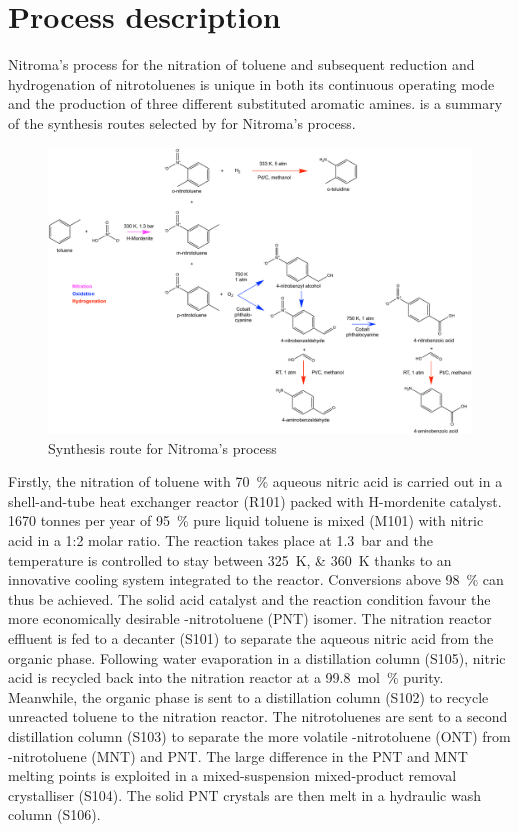 \section{Process description}

Nitroma's process for the nitration of toluene and subsequent reduction and hydrogenation of nitrotoluenes is unique in both its continuous operating mode and the production of three different substituted aromatic amines.   is a summary of the synthesis routes selected by for Nitroma's process.
\begin{figure}[H]
    \centering
    \includegraphics[width=0.8\linewidth]{chapters/2-reaction/figures/routes-chosen.pdf}
    \caption{Synthesis route for Nitroma's process}
    \label{fig:routes-SI}
\end{figure}

Firstly, the nitration of toluene with \SI{70}{\percent} aqueous nitric acid is carried out in a shell-and-tube heat exchanger reactor (R101) packed with H-mordenite catalyst. 1670 tonnes per year of \SI{95}{\percent} pure liquid toluene is mixed (M101) with nitric acid in a 1:2 molar ratio. The reaction takes place at \SI{1.3}{\bar} and the temperature is controlled to stay between \SIlist{325;360}{\K} thanks to an innovative cooling system integrated to the reactor. Conversions above \SI{98}{\percent} can thus be achieved. The solid acid catalyst and the reaction condition favour the more economically desirable \para-nitrotoluene (PNT) isomer. The nitration reactor effluent is fed to a decanter (S101) to separate the aqueous nitric acid from the organic phase. Following water evaporation in a distillation column (S105), nitric acid is recycled back into the nitration reactor at a \SI{99.8}{\mol\percent} purity.  Meanwhile, the organic phase is sent to a distillation column (S102) to recycle unreacted toluene to the nitration reactor. The nitrotoluenes are sent to a second distillation column (S103) to separate the more volatile \ortho-nitrotoluene (ONT) from \meta-nitrotoluene (MNT) and PNT. The large difference in the PNT and MNT melting points is exploited in a mixed-suspension mixed-product removal crystalliser (S104). The solid PNT crystals are then melt in a hydraulic wash column (S106).

